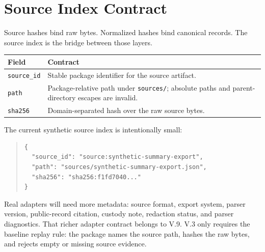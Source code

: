 \section{Source Index Contract}

Source hashes bind raw bytes. Normalized hashes bind canonical records. The
source index is the bridge between those layers.

\begin{center}
\small
\begin{tabularx}{\textwidth}{lX}
\toprule
Field & Contract \\
\midrule
\texttt{source\_id} & Stable package identifier for the source artifact. \\
\texttt{path} & Package-relative path under \texttt{sources/}; absolute paths and parent-directory escapes are invalid. \\
\texttt{sha256} & Domain-separated hash over the raw source bytes. \\
\bottomrule
\end{tabularx}
\end{center}

The current synthetic source index is intentionally small:
\begin{quote}
\footnotesize
\begin{verbatim}
{
  "source_id": "source:synthetic-summary-export",
  "path": "sources/synthetic-summary-export.json",
  "sha256": "sha256:f1fd7040..."
}
\end{verbatim}
\end{quote}

Real adapters will need more metadata: source format, export system, parser
version, public-record citation, custody note, redaction status, and parser
diagnostics. That richer adapter contract belongs to V.9. V.3 only requires the
baseline replay rule: the package names the source path, hashes the raw bytes,
and rejects empty or missing source evidence.
